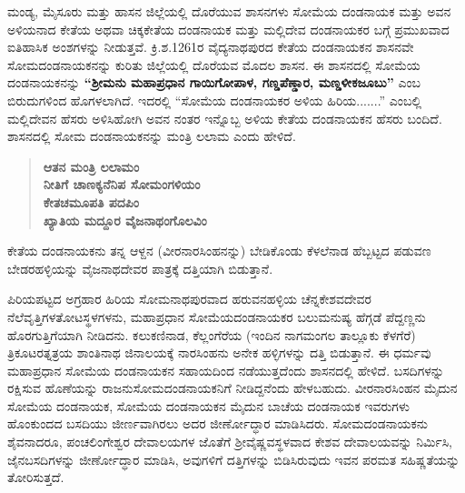 ಮಂಡ್ಯ, ಮೈಸೂರು ಮತ್ತು ಹಾಸನ ಜಿಲ್ಲೆಯಲ್ಲಿ ದೊರೆಯುವ ಶಾಸನಗಳು ಸೋಮೆಯ ದಂಡನಾಯಕ ಮತ್ತು ಅವನ ಅಳಿಯನಾದ ಕೇತೆಯ ಅಥವಾ ಚಿಕ್ಕಕೇತೆಯ ದಂಡನಾಯಕ ಮತ್ತು ಮಲ್ಲಿದೇವ ದಂಡನಾಯಕರ ಬಗ್ಗೆ ಪ್ರಮುಖವಾದ ಐತಿಹಾಸಿಕ ಅಂಶಗಳನ್ನು ನೀಡುತ್ತವೆ. ಕ್ರಿ.ಶ.1261ರ ವೈದ್ಯನಾಥಪುರದ ಕೇತೆಯ ದಂಡನಾಯಕನ ಶಾಸನವೇ ಸೋಮದಂಡನಾಯಕನನ್ನು ಕುರಿತು ಜಿಲ್ಲೆಯಲ್ಲಿ ದೊರೆಯವ ಮೊದಲ ಶಾಸನ. ಈ ಶಾಸನದಲ್ಲಿ ಸೋಮೆಯ ದಂಡನಾಯಕನನ್ನು \textbf{“ಶ‍್ರೀಮನು ಮಹಾಪ್ರಧಾನ ಗಾಯಿಗೋಪಾಳ, ಗಣ್ಡಪೆಣ್ಡಾರ, ಮಣ್ಡಳೀಕಜೂಬು”} ಎಂಬ ಬಿರುದುಗಳಿಂದ ಹೊಗಳಲಾಗಿದೆ. ಇದರಲ್ಲಿ “ಸೋಮೆಯ ದಂಡನಾಯಕರ ಅಳಿಯ ಹಿರಿಯ.......” ಎಂಬಲ್ಲಿ ಮಲ್ಲಿದೇವನ ಹೆಸರು ಅಳಿಸಿಹೋಗಿ ಅವನ ನಂತರ ಇನ್ನೊಬ್ಬ ಅಳಿಯ ಕೇತೆಯ ದಂಡನಾಯಕನ ಹೆಸರು ಬಂದಿದೆ. ಶಾಸನದಲ್ಲಿ ಸೋಮ ದಂಡನಾಯಕನನ್ನು ಮಂತ್ರಿ ಲಲಾಮ ಎಂದು ಹೇಳಿದೆ.

\begin{verse}
\textbf{ಆತನ ಮಂತ್ರಿ ಲಲಾಮಂ} \\\textbf{ನೀತಿಗೆ ಚಾಣಕ್ಯನೆನಿಪ ಸೋಮಂಗಳಿಯಂ } \\\textbf{ಕೇತಚಮೂಪತಿ ಪದಪಿಂ} \\\textbf{ಖ್ಯಾತಿಯ ಮದ್ದೂರ ವೈಜನಾಥಂಗೊಲವಿಂ}
\end{verse}

ಕೇತೆಯ ದಂಡನಾಯಕನು ತನ್ನ ಆಳ್ದನ (ವೀರನಾರಸಿಂಹನನ್ನು) ಬೇಡಿಕೊಂಡು ಕೆಳಲೆನಾಡ ಹೆಬ್ಬಟ್ಟದ ಪಡುವಣ ಬೇಡರಹಳ್ಳಿಯನ್ನು ವೈಜನಾಥದೇವರ ಪಾತ್ರಕ್ಕೆ ದತ್ತಿಯಾಗಿ ಬಿಡುತ್ತಾನೆ.

\vskip 2pt

ಪಿರಿಯಪಟ್ಟದ ಅಗ್ರಹಾರ ಹಿರಿಯ ಸೋಮನಾಥಪುರವಾದ ಹರುವನಹಳ್ಳಿಯ ಚೆನ್ನಕೇಶವದೇವರ ನೆಲೆವೃತ್ತಿಗಳ\break ತೋಟಸ್ಥಳಗಳನು, ಮಹಾಪ್ರಧಾನ ಸೋಮೆಯದಂಡನಾಯಕರ ಬಲುಮನುಷ್ಯ ಹೆಗ್ಗಡೆ ಪೆದ್ದಣ್ಣನು ಹೊರಗುತ್ತಿಗೆಯಾಗಿ ನೀಡಿದನು. ಕಲುಕಣಿನಾಡ, ಕೆಲ್ಲಂಗೆರೆಯ (ಇಂದಿನ ನಾಗಮಂಗಲ ತಾಲ್ಲೂಕು ಕೆಳಗೆರೆ) ತ್ರಿಕೂಟರತ್ನತ್ರಯ ಶಾಂತಿನಾಥ ಜಿನಾಲಯಕ್ಕೆ ನಾರಸಿಂಹನು ಅನೇಕ ಹಳ್ಳಿಗಳನ್ನು ದತ್ತಿ ಬಿಡುತ್ತಾನೆ. ಈ ಧರ್ಮವು ಮಹಾಪ್ರಧಾನ ಸೋಮೆಯ ದಂಡನಾಯಕನ ಸಹಾಯದಿಂದ ನಡೆಯುತ್ತದೆಂದು ಶಾಸನದಲ್ಲಿ ಹೇಳಿದೆ. ಬಸದಿಗಳನ್ನು ರಕ್ಷಿಸುವ ಹೊಣೆಯನ್ನು ರಾಜನು\break ಸೋಮದಂಡನಾಯಕನಿಗೆ ನೀಡಿದ್ದನೆಂದು ಹೇಳಬಹುದು. ವೀರನಾರಸಿಂಹನ ಮೈದುನ ಸೋಮೆಯ ದಂಡನಾಯಕ, ಸೋಮೆಯ ದಂಡನಾಯಕನ ಮೈದುನ ಬಾಚೆಯ ದಂಡನಾಯಕ ಇವರುಗಳು ಹೊಂಕುಂದದ ಬಸದಿಯು ಜೀರ್ಣವಾಗಿರಲು ಅದರ ಜೀರ್ಣೋದ್ಧಾರ ಮಾಡಿಸಿದರು. ಸೋಮದಂಡನಾಯಕನು ಶೈವನಾದರೂ, ಪಂಚಲಿಂಗೇಶ್ವರ ದೇವಾಲಯಗಳ ಜೊತೆಗೆ ಶ‍್ರೀವೈಷ್ಣವಸ್ಥಳವಾದ ಕೇಶವ ದೇವಾಲಯವನ್ನು ನಿರ್ಮಿಸಿ, ಜೈನಬಸದಿಗಳನ್ನು ಜೀರ್ಣೋದ್ಧಾರ ಮಾಡಿಸಿ, ಅವುಗಳಿಗೆ ದತ್ತಿಗಳನ್ನು ಬಿಡಿಸಿರುವುದು ಇವನ ಪರಮತ ಸಹಿಷ್ಣತೆಯನ್ನು ತೋರಿಸುತ್ತದೆ.

\vskip 2pt

